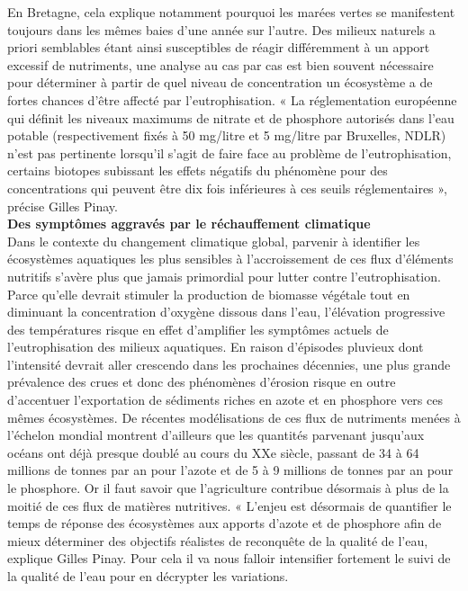 \documentclass[8pt]{article}
\begin{document}
En Bretagne, cela explique notamment pourquoi les marées vertes se manifestent toujours dans les mêmes baies d’une année sur l’autre. Des milieux naturels a priori semblables étant ainsi susceptibles de réagir différemment à un apport excessif de nutriments, une analyse au cas par cas est bien souvent nécessaire pour déterminer à partir de quel niveau de concentration un écosystème a de fortes chances d’être affecté par l’eutrophisation. « La réglementation européenne qui définit les niveaux maximums de nitrate et de phosphore autorisés dans l’eau potable (respectivement fixés à  50 mg/litre et 5 mg/litre par Bruxelles, NDLR) n’est pas pertinente lorsqu’il s’agit de faire face au problème de l’eutrophisation, certains biotopes subissant les effets négatifs du phénomène pour des concentrations qui peuvent être dix fois inférieures à ces seuils réglementaires », précise Gilles Pinay.\\

\textbf{Des symptômes aggravés par le réchauffement climatique}\\

Dans le contexte du changement climatique global, parvenir à identifier les écosystèmes aquatiques les plus sensibles à l’accroissement de ces flux d’éléments nutritifs s’avère plus que jamais primordial pour lutter contre l’eutrophisation. Parce qu’elle devrait stimuler la production de biomasse végétale tout en diminuant la concentration d’oxygène dissous dans l’eau, l’élévation progressive des températures risque en effet d’amplifier les symptômes actuels de l’eutrophisation des milieux aquatiques. En raison d’épisodes pluvieux dont l’intensité devrait aller crescendo dans les prochaines décennies, une plus grande prévalence des crues et donc des phénomènes d’érosion risque en outre d’accentuer l’exportation de sédiments riches en azote et en phosphore vers ces mêmes écosystèmes. De récentes modélisations de ces flux de nutriments menées à l’échelon mondial montrent d’ailleurs que les quantités parvenant jusqu’aux océans ont déjà presque doublé au cours du XXe siècle, passant de 34 à 64 millions de tonnes par an pour l’azote et de 5 à 9 millions de tonnes par an pour le phosphore. Or il faut savoir que l’agriculture contribue désormais à plus de la moitié de ces flux de matières nutritives. « L'enjeu est désormais de quantifier le temps de réponse des écosystèmes aux apports d'azote et de phosphore afin de mieux déterminer des objectifs réalistes de reconquête de la qualité de l'eau, explique Gilles Pinay. Pour cela il va nous falloir intensifier fortement le suivi de la qualité de l’eau pour en décrypter les variations. 
\end{document}
